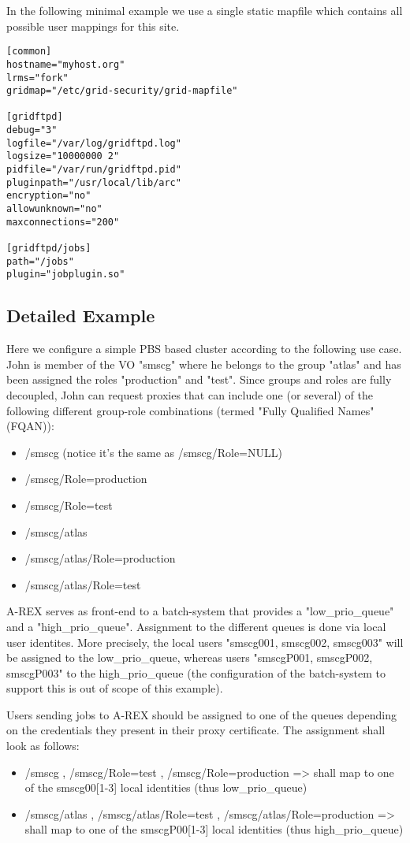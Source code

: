 \documentclass{article}
\begin{document}
In the following minimal example we use a single static mapfile which
contains all possible user mappings for this site.

\begin{verbatim}
[common]
hostname="myhost.org"
lrms="fork"
gridmap="/etc/grid-security/grid-mapfile"

[gridftpd]
debug="3"
logfile="/var/log/gridftpd.log"
logsize="10000000 2"
pidfile="/var/run/gridftpd.pid"
pluginpath="/usr/local/lib/arc"
encryption="no"
allowunknown="no"
maxconnections="200"

[gridftpd/jobs]
path="/jobs"
plugin="jobplugin.so"
\end{verbatim}


\subsection{Detailed Example}

Here we configure a simple PBS based cluster according to the
following use case.  John is member of the VO "smscg" where he belongs
to the group "atlas" and has been assigned the roles "production" and
"test". Since groups and roles are fully decoupled, John can request
proxies that can include one (or several) of the following different
group-role combinations (termed "Fully Qualified Names" (FQAN)):
\begin{itemize}
\item /smscg (notice it's the same as /smscg/Role=NULL)
\item /smscg/Role=production
\item /smscg/Role=test
\item /smscg/atlas
\item /smscg/atlas/Role=production
\item /smscg/atlas/Role=test
\end{itemize}

A-REX serves as front-end to a batch-system that provides a
"low\_prio\_queue" and a "high\_prio\_queue". Assignment to the
different queues is done via local user identites.  More precisely,
the local users "smscg001, smscg002, smscg003" will be assigned to the
low\_prio\_queue, whereas users "smscgP001, smscgP002, smscgP003" to
the high\_prio\_queue (the configuration of the batch-system to support
this is out of scope of this example).

Users sending jobs to A-REX should be assigned to one of the queues
depending on the credentials they present in their proxy
certificate. The assignment shall look as follows:
\begin{itemize}
\item /smscg , /smscg/Role=test , /smscg/Role=production => shall map
  to one of the smscg00[1-3] local identities (thus low\_prio\_queue)
\item /smscg/atlas , /smscg/atlas/Role=test ,
  /smscg/atlas/Role=production => shall map to one of the
  smscgP00[1-3] local identities (thus high\_prio\_queue)
\end{itemize}
\end{document}
